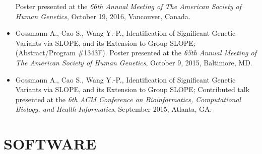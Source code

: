 \documentclass[overlapped, line, 10pt]{res} %
\begin{document}
\begin{resume}
\begin{itemize}
    Poster presented at the \textit{66th Annual Meeting of The American Society of Human Genetics},
    October 19, 2016, Vancouver, Canada.
  \item
    Gossmann A., Cao S., Wang Y.-P., Identification of Significant Genetic Variants via SLOPE, and its Extension to Group SLOPE;
    (Abstract/Program \#1343F).
    Poster presented at the \textit{65th Annual Meeting of The American Society of Human Genetics},
    October 9, 2015, Baltimore, MD.
  \item
    Gossmann A., Cao S., Wang Y.-P., Identification of Significant Genetic Variants via SLOPE, and its Extension to Group SLOPE;
    Contributed talk presented at the \textit{6th ACM Conference on Bioinformatics, Computational Biology, and Health Informatics},
    September 2015, Atlanta, GA.
\end{itemize}


\section{SOFTWARE}


\end{resume}
\end{document}
